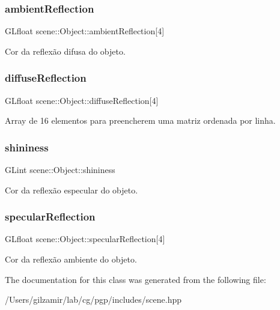 \subsubsection{\texorpdfstring{ambient\+Reflection}{ambientReflection}}
{\footnotesize\ttfamily G\+Lfloat scene\+::\+Object\+::ambient\+Reflection\mbox{[}4\mbox{]}}

Cor da reflexão difusa do objeto. \mbox{\label{classscene_1_1_object_a4608ddd5375279ce31e1da48e9963759}} 
\subsubsection{\texorpdfstring{diffuse\+Reflection}{diffuseReflection}}
{\footnotesize\ttfamily G\+Lfloat scene\+::\+Object\+::diffuse\+Reflection\mbox{[}4\mbox{]}}

Array de 16 elementos para preencherem uma matriz ordenada por linha. \mbox{\label{classscene_1_1_object_ad0d064fc3da95f59e0fea3a39122e9c5}} 
\subsubsection{\texorpdfstring{shininess}{shininess}}
{\footnotesize\ttfamily G\+Lint scene\+::\+Object\+::shininess}

Cor da reflexão especular do objeto. \mbox{\label{classscene_1_1_object_ae584bfd42e862d486b31567c3f996773}} 
\subsubsection{\texorpdfstring{specular\+Reflection}{specularReflection}}
{\footnotesize\ttfamily G\+Lfloat scene\+::\+Object\+::specular\+Reflection\mbox{[}4\mbox{]}}

Cor da reflexão ambiente do objeto. 

The documentation for this class was generated from the following file\+:\begin{DoxyCompactItemize}
\item 
/\+Users/gilzamir/lab/cg/pgp/includes/scene.\+hpp\end{DoxyCompactItemize}
